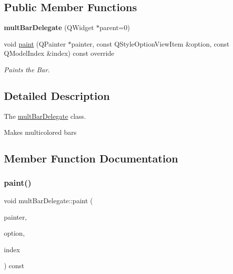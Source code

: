 \subsection*{Public Member Functions}
\begin{DoxyCompactItemize}
\item 
\mbox{\label{classmult_bar_delegate_a6d50b5e98fb20c2a3dc65a7e092a54cb}} 
{\bfseries mult\+Bar\+Delegate} (Q\+Widget $\ast$parent=0)
\item 
void \mbox{\hyperlink{classmult_bar_delegate_a519a6a0e8f77f531839ee497e3429752}{paint}} (Q\+Painter $\ast$painter, const Q\+Style\+Option\+View\+Item \&option, const Q\+Model\+Index \&index) const override
\begin{DoxyCompactList}\small\item\em Paints the Bar. \end{DoxyCompactList}\end{DoxyCompactItemize}


\subsection{Detailed Description}
The \mbox{\hyperlink{classmult_bar_delegate}{mult\+Bar\+Delegate}} class. 

Makes multicolored bars 

\subsection{Member Function Documentation}
\mbox{\label{classmult_bar_delegate_a519a6a0e8f77f531839ee497e3429752}} 
\subsubsection{\texorpdfstring{paint()}{paint()}}
{\footnotesize\ttfamily void mult\+Bar\+Delegate\+::paint (\begin{DoxyParamCaption}\item[{Q\+Painter $\ast$}]{painter,  }\item[{const Q\+Style\+Option\+View\+Item \&}]{option,  }\item[{const Q\+Model\+Index \&}]{index }\end{DoxyParamCaption}) const\hspace{0.3cm}{\ttfamily [override]}}



